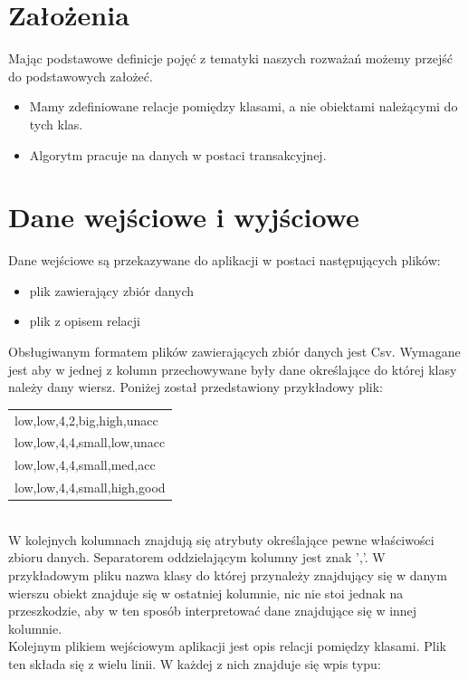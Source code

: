 \documentclass[a4paper,12pt]{article}
\begin{document}
\section{Założenia}


Mając podstawowe definicje pojęć z tematyki naszych rozważań możemy przejść do podstawowych założeć. \\
\begin{itemize}
\item Mamy zdefiniowane relacje pomiędzy klasami, a nie obiektami należącymi do tych klas.
\item Algorytm pracuje na danych w postaci transakcyjnej.
\end{itemize}

\section{Dane wejściowe i wyjściowe}
\label{opis_danych}
Dane wejściowe są przekazywane do aplikacji w postaci następujących plików:
\begin{itemize}
\item plik zawierający zbiór danych
\item plik z opisem relacji
\end{itemize}
Obsługiwanym formatem plików zawierających zbiór danych jest Csv. Wymagane jest aby w jednej z kolumn przechowywane były dane określające do której klasy należy dany wiersz. Poniżej został przedstawiony przykładowy plik: \\

\begin{tabular}{l}
low,low,4,2,big,high,unacc \\
low,low,4,4,small,low,unacc \\
low,low,4,4,small,med,acc \\
low,low,4,4,small,high,good \\
\end{tabular}
\\

W kolejnych kolumnach znajdują się atrybuty określające pewne właściwości zbioru danych. Separatorem oddzielającym kolumny jest znak ','. W przykładowym pliku nazwa klasy do której przynależy znajdujący się w danym wierszu obiekt znajduje się w ostatniej kolumnie, nic nie stoi jednak na przeszkodzie, aby w ten sposób interpretować dane znajdujące się w innej kolumnie. \\

Kolejnym plikiem wejściowym aplikacji jest opis relacji pomiędzy klasami. Plik ten składa się z wielu linii. W każdej z nich znajduje się wpis typu:\\
\end{document}
